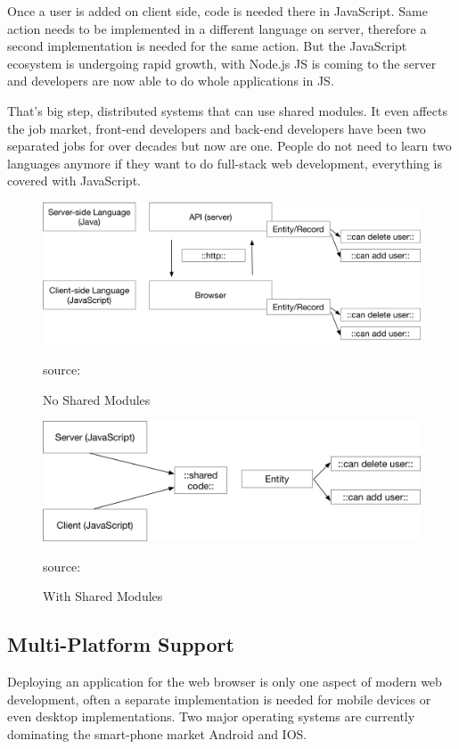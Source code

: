 Once a user is added on client side, code is needed there in JavaScript. Same action needs to be implemented in a different language on server, 
therefore a second implementation is needed for the same action.
But the JavaScript ecosystem is undergoing rapid growth, with Node.js \gls{JS} is coming to the server and developers are now able to do whole applications in \gls{JS}.

That's big step, distributed systems that can use shared modules. It even affects the job market, front-end developers and back-end developers have been two separated jobs for over decades but now are one. People do not need to learn two languages anymore if they want to do full-stack web development, everything is covered with JavaScript.

\begin{figure}[H]
	\centering
	\includegraphics[width=0.8\linewidth]{bilder/grundlagen/Entity1.png}
	\caption{No Shared Modules} source:\cite{Distributed1}
	\label{fig:DS1}
\end{figure}

\begin{figure}[H]
	\centering
	\includegraphics[width=0.8\linewidth]{bilder/grundlagen/Entity2.png}
	\caption{With Shared Modules} source:\cite{Distributed2}
	\label{fig:DS2}
\end{figure}


\subsection{Multi-Platform Support}

Deploying an application for the web browser is only one aspect of modern web development, often a separate implementation is needed for mobile devices or even desktop implementations. Two major operating systems are currently dominating the smart-phone market Android and IOS. 

